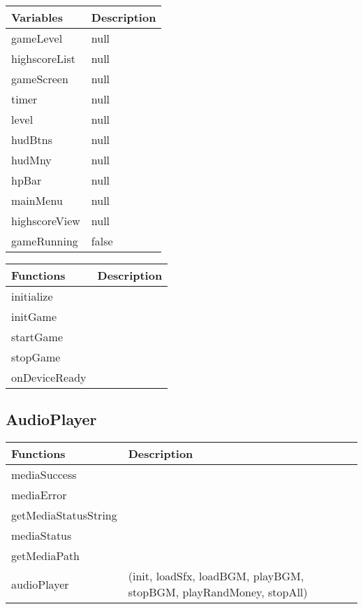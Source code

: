	\begin{table}[H]
	\begin{tabular}{p{4cm} | p{8cm} }
	\hline
	\rowcolor{gray}
	Variables & Description \\ \hline
	gameLevel & null \\ \hline
  	highscoreList & null \\ \hline
  	gameScreen & null \\ \hline
  	timer & null \\ \hline
  	level & null \\ \hline
  	hudBtns & null \\ \hline
  	hudMny & null \\ \hline
  	hpBar & null \\ \hline
  	mainMenu & null \\ \hline
  	highscoreView & null \\ \hline
  	gameRunning & false \\ \hline
	
	\end{tabular}
	\end{table}

	\begin{table}[H]
	\begin{tabular}{p{4cm} | p{8cm} }
	\hline
	\rowcolor{gray}
	Functions & Description \\ \hline
	initialize & \\ \hline
  	initGame & \\ \hline
  	startGame & \\ \hline
  	stopGame & \\ \hline
  	onDeviceReady & \\ \hline

	\end{tabular}
	\end{table}

	



\subsection*{AudioPlayer}

	\begin{table}[H]
	\begin{tabular}{p{4cm} | p{8cm} }
	\hline
	\rowcolor{gray}
	Functions & Description \\ \hline
	mediaSuccess & \\ \hline
	mediaError & \\ \hline
	getMediaStatusString & \\ \hline
	mediaStatus & \\ \hline
	getMediaPath & \\ \hline
	audioPlayer & (init, loadSfx, loadBGM, playBGM, stopBGM, playRandMoney, stopAll) \\ \hline
	\end{tabular}
	\end{table}



